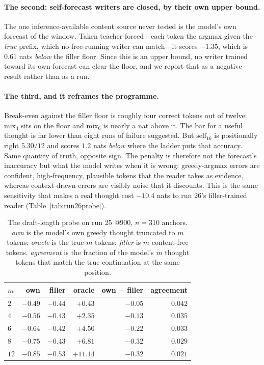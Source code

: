 \documentclass{article} %
\begin{document}
\paragraph{The second: self-forecast writers are closed, by their own upper bound.} The one inference-available content source never tested is the model's own forecast of the window. Taken teacher-forced---each token the argmax given the \emph{true} prefix, which no free-running writer can match---it scores $-1.35$, which is $0.61$ nats \emph{below} the filler floor. Since this is an upper bound, no writer trained toward its own forecast can clear the floor, and we report that as a negative result rather than as a run.

\paragraph{The third, and it reframes the programme.} Break-even against the filler floor is roughly four correct tokens out of twelve: $\mathrm{mix}_4$ sits on the floor and $\mathrm{mix}_6$ is nearly a nat above it. The bar for a useful thought is far lower than eight runs of failure suggested. But $\mathrm{self}_{16}$ is positionally right $5.30/12$ and scores $1.2$ nats \emph{below} where the ladder puts that accuracy. Same quantity of truth, opposite sign. The penalty is therefore not the forecast's inaccuracy but what the model writes when it is wrong: greedy-argmax errors are confident, high-frequency, plausible tokens that the reader takes as evidence, whereas context-drawn errors are visibly noise that it discounts. This is the same sensitivity that makes a real thought cost $-10.4$ nats to run 26's filler-trained reader (Table~\ref{tab:run26probe}).

\begin{table}[h]
\centering
\caption{The draft-length probe on run 25 @900, $n=310$ anchors. \emph{own} is the model's own greedy thought truncated to $m$ tokens; \emph{oracle} is the true $m$ tokens; \emph{filler} is $m$ content-free tokens. \emph{agreement} is the fraction of the model's $m$ thought tokens that match the true continuation at the same position.}
\label{tab:draft}
\begin{tabular}{lrrrrr}
\toprule
$m$ & own & filler & oracle & own $-$ filler & agreement \\
\midrule
$2$  & $-0.49$ & $-0.44$ & $+0.43$  & $-0.05$ & $0.042$ \\
$4$  & $-0.56$ & $-0.43$ & $+2.35$  & $-0.13$ & $0.035$ \\
$6$  & $-0.64$ & $-0.42$ & $+4.50$  & $-0.22$ & $0.033$ \\
$8$  & $-0.75$ & $-0.43$ & $+6.81$  & $-0.32$ & $0.029$ \\
$12$ & $-0.85$ & $-0.53$ & $+11.14$ & $-0.32$ & $0.021$ \\
\bottomrule
\end{tabular}
\end{table}
\end{document}
